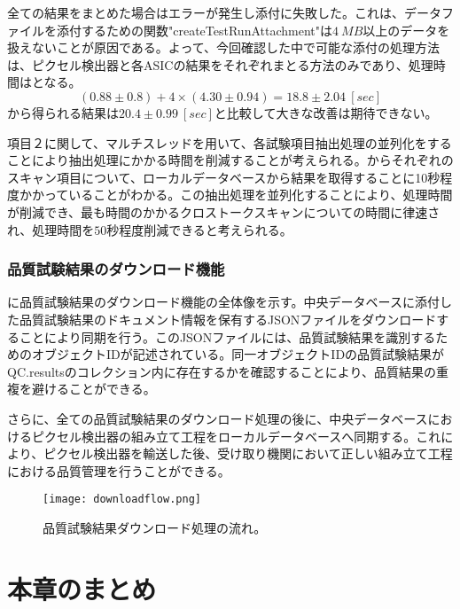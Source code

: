 全ての結果をまとめた場合はエラーが発生し添付に失敗した。これは、データファイルを添付するための関数"createTestRunAttachment"は$4\ \si{MB}$以上のデータを扱えないことが原因である。よって、今回確認した中で可能な添付の処理方法は、ピクセル検出器と各ASICの結果をそれぞれまとる方法のみであり、処理時間はとなる。
\begin{equation}
  \label{eq:asshuku}
  (0.88 \pm 0.8) + 4\times(4.30 \pm 0.94) = 18.8 \pm 2.04\ [\si{sec}]
\end{equation}
から得られる結果は$20.4 \pm 0.99\ [\si{sec}]$と比較して大きな改善は期待できない。

項目２に関して、マルチスレッドを用いて、各試験項目抽出処理の並列化をすることにより抽出処理にかかる時間を削減することが考えられる。からそれぞれのスキャン項目について、ローカルデータベースから結果を取得することに10秒程度かかっていることがわかる。この抽出処理を並列化することにより、処理時間が削減でき、最も時間のかかるクロストークスキャンについての時間に律速され、処理時間を$50$秒程度削減できると考えられる。


\subsubsection{品質試験結果のダウンロード機能}


に品質試験結果のダウンロード機能の全体像を示す。中央データベースに添付した品質試験結果のドキュメント情報を保有するJSONファイルをダウンロードすることにより同期を行う。このJSONファイルには、品質試験結果を識別するためのオブジェクトIDが記述されている。同一オブジェクトIDの品質試験結果がQC.resultsのコレクション内に存在するかを確認することにより、品質結果の重複を避けることができる。

さらに、全ての品質試験結果のダウンロード処理の後に、中央データベースにおけるピクセル検出器の組み立て工程をローカルデータベースへ同期する。これにより、ピクセル検出器を輸送した後、受け取り機関において正しい組み立て工程における品質管理を行うことができる。

\begin{figure}[tbp]
  \centering
  \texttt{[image: downloadflow.png]}
  \caption[品質試験結果ダウンロード処理の流れ]{品質試験結果ダウンロード処理の流れ。}
  \label{fig:downloadresults}
\end{figure}



\section{本章のまとめ}
\label{sec:summary-7}







\newpage

